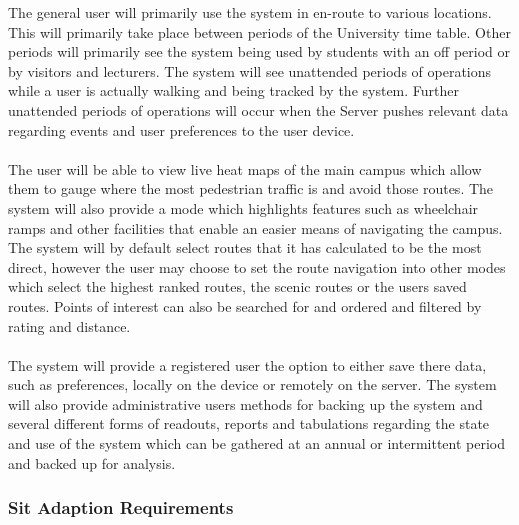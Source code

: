 \documentclass{article}
\begin{document}
{            	The general user will primarily use the system in en-route to various locations. This will primarily take place between periods of the University time table. Other periods will primarily see the system being used by students with an off period or by visitors and lecturers. The system will see unattended periods of operations while a user is actually walking and being tracked by the system. Further unattended periods of operations will occur when the Server pushes relevant data regarding events and user preferences to the user device.\\\\
            	The user will be able to view live heat maps of the main campus which allow them to gauge where the most pedestrian traffic is and avoid those routes. The system will also provide a mode which highlights features such as wheelchair ramps and other facilities that enable an easier means of navigating the campus. The system will by default select routes that it has calculated to be the most direct, however the user may choose to set the route navigation into other modes which select the highest ranked routes, the scenic routes or the users saved routes. Points of interest can also be searched for and ordered and filtered by rating and distance.\\\\
            	The system will provide a registered user the option to either save there data, such as preferences, locally on the device or remotely on the server. The system will also provide administrative users methods for backing up the system and several different forms of readouts, reports and tabulations regarding the state and use of the system which can be gathered at an annual or intermittent period and backed up for analysis.}
            \subsubsection{Sit Adaption Requirements}
        
\end{document}
